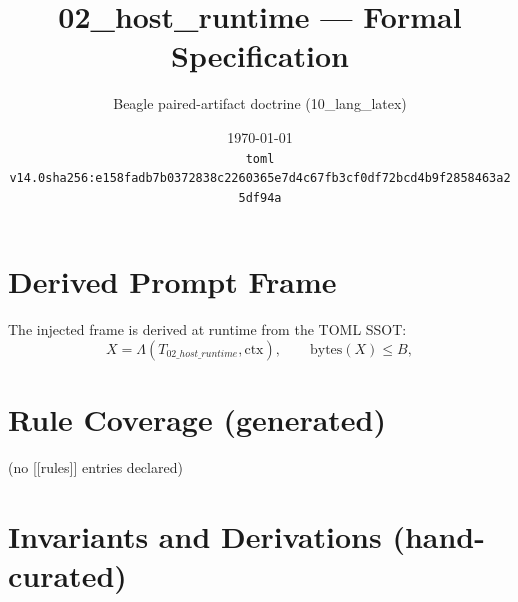 \documentclass[11pt]{article}
\title{02\_host\_runtime --- Formal Specification}
\author{Beagle paired-artifact doctrine (10\_lang\_latex)}
\date{\today\\ \texttt{toml v14.0\quad sha256:e158fadb7b0372838c2260365e7d4c67fb3cf0df72bcd4b9f2858463a25df94a}}
\begin{document}
\maketitle

\section{Derived Prompt Frame}
The injected frame is derived at runtime from the TOML SSOT:
\begin{equation}
  X = \Lambda(T_{02\_host\_runtime}, \mathrm{ctx}), \qquad \mathrm{bytes}(X) \le B,
  \label{lbl:derive-frame}
\end{equation}

\section{Rule Coverage (generated)}
(no [[rules]] entries declared)

\section{Invariants and Derivations (hand-curated)}
\end{document}
